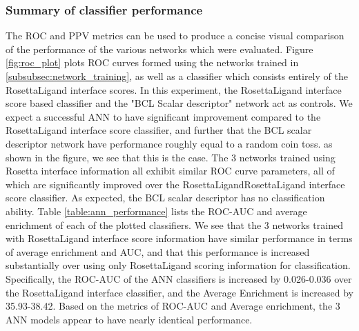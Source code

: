 \subsubsection{Summary of classifier performance}
The ROC and PPV metrics can be used to produce a concise visual comparison of the performance of the various networks which were evaluated.
Figure \ref{fig:roc_plot} plots ROC curves formed using the networks trained in \ref{subsubsec:network_training}, as well as a classifier which consists entirely of the RosettaLigand interface scores. 
In this experiment, the RosettaLigand interface score based classifier and the "BCL Scalar descriptor" network act as controls.
We expect a successful ANN to have significant improvement compared to the RosettaLigand interface score classifier, and further that the BCL scalar descriptor network have performance roughly equal to a random coin toss.
as shown in the figure, we see that this is the case.  The 3 networks trained using Rosetta interface information all exhibit similar ROC curve parameters, all of which are significantly improved over the RosettaLigandRosettaLigand interface score classifier.
As expected, the BCL scalar descriptor has no classification ability.
Table \ref{table:ann_performance} lists the ROC-AUC and average enrichment of each of the plotted classifiers.
We see that the 3 networks trained with RosettaLigand interface score information have similar performance in terms of average enrichment and AUC, and that this performance is increased substantially over using only RosettaLigand scoring information for classification.
Specifically, the ROC-AUC of the ANN classifiers is increased by 0.026-0.036 over the RosettaLigand interface classifier, and the Average Enrichment is increased by 35.93-38.42.
Based on the metrics of ROC-AUC and Average enrichment, the 3 ANN models appear to have nearly identical performance.
